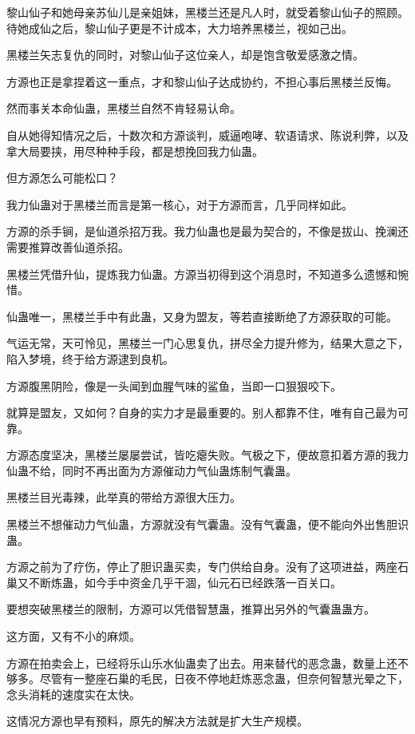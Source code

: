 \begin{this_body}
黎山仙子和她母亲苏仙儿是亲姐妹，黑楼兰还是凡人时，就受着黎山仙子的照顾。待她成仙之后，黎山仙子更是不计成本，大力培养黑楼兰，视如己出。

黑楼兰矢志复仇的同时，对黎山仙子这位亲人，却是饱含敬爱感激之情。

方源也正是拿捏着这一重点，才和黎山仙子达成协约，不担心事后黑楼兰反悔。

然而事关本命仙蛊，黑楼兰自然不肯轻易认命。

自从她得知情况之后，十数次和方源谈判，威逼咆哮、软语请求、陈说利弊，以及拿大局要挟，用尽种种手段，都是想挽回我力仙蛊。

但方源怎么可能松口？

我力仙蛊对于黑楼兰而言是第一核心，对于方源而言，几乎同样如此。

方源的杀手锏，是仙道杀招万我。我力仙蛊也是最为契合的，不像是拔山、挽澜还需要推算改善仙道杀招。

黑楼兰凭借升仙，提炼我力仙蛊。方源当初得到这个消息时，不知道多么遗憾和惋惜。

仙蛊唯一，黑楼兰手中有此蛊，又身为盟友，等若直接断绝了方源获取的可能。

气运无常，天可怜见，黑楼兰一门心思复仇，拼尽全力提升修为，结果大意之下，陷入梦境，终于给方源逮到良机。

方源腹黑阴险，像是一头闻到血腥气味的鲨鱼，当即一口狠狠咬下。

就算是盟友，又如何？自身的实力才是最重要的。别人都靠不住，唯有自己最为可靠。

方源态度坚决，黑楼兰屡屡尝试，皆吃瘪失败。气极之下，便故意扣着方源的我力仙蛊不给，同时不再出面为方源催动力气仙蛊炼制气囊蛊。

黑楼兰目光毒辣，此举真的带给方源很大压力。

黑楼兰不想催动力气仙蛊，方源就没有气囊蛊。没有气囊蛊，便不能向外出售胆识蛊。

方源之前为了疗伤，停止了胆识蛊买卖，专门供给自身。没有了这项进益，两座石巢又不断炼蛊，如今手中资金几乎干涸，仙元石已经跌落一百关口。

要想突破黑楼兰的限制，方源可以凭借智慧蛊，推算出另外的气囊蛊蛊方。

这方面，又有不小的麻烦。

方源在拍卖会上，已经将乐山乐水仙蛊卖了出去。用来替代的恶念蛊，数量上还不够多。尽管有一整座石巢的毛民，日夜不停地赶炼恶念蛊，但奈何智慧光晕之下，念头消耗的速度实在太快。

这情况方源也早有预料，原先的解决方法就是扩大生产规模。


\end{this_body}
